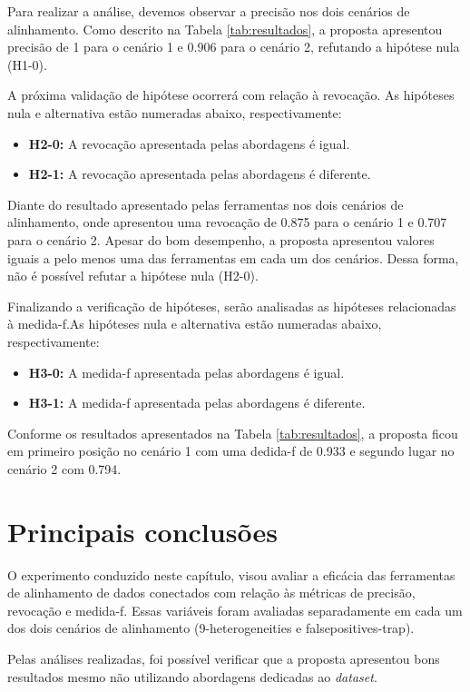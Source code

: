 Para realizar a análise, devemos observar a precisão nos dois cenários de alinhamento. Como descrito na Tabela \ref{tab:resultados}, a proposta apresentou precisão de 1 para o cenário 1 e 0.906 para o cenário 2, refutando a hipótese nula (H1-0).

A próxima validação de hipótese ocorrerá com relação à revocação. As hipóteses nula e alternativa estão numeradas abaixo, respectivamente:

\begin{itemize}
\item \textbf{H2-0:} A revocação apresentada pelas abordagens é igual.
\item \textbf{H2-1:} A revocação apresentada pelas abordagens é diferente.
\end{itemize}

Diante do resultado apresentado pelas ferramentas nos dois cenários de alinhamento, onde apresentou uma revocação de 0.875 para o cenário 1 e 0.707 para o cenário 2. Apesar do bom desempenho, a proposta apresentou valores iguais a pelo menos uma das ferramentas em cada um dos cenários. Dessa forma, não é possível refutar a hipótese nula (H2-0).

Finalizando a verificação de hipóteses, serão analisadas as hipóteses relacionadas à medida-f.As hipóteses nula e alternativa estão numeradas abaixo, respectivamente:

\begin{itemize}
\item \textbf{H3-0:} A medida-f apresentada pelas abordagens é igual.
\item \textbf{H3-1:} A medida-f apresentada pelas abordagens é diferente.
\end{itemize}

Conforme os resultados apresentados na Tabela \ref{tab:resultados}, a proposta ficou em primeiro posição no cenário 1 com uma dedida-f de 0.933 e segundo lugar no cenário 2 com 0.794.

\section{Principais conclusões}
O experimento conduzido neste capítulo, visou avaliar a eficácia das ferramentas de alinhamento de dados conectados com relação às métricas de precisão, revocação e medida-f. Essas variáveis foram avaliadas separadamente em cada um dos dois cenários de alinhamento (9-heterogeneities e falsepositives-trap).

Pelas análises realizadas, foi possível verificar que a proposta apresentou bons resultados mesmo não utilizando abordagens dedicadas ao \textit{dataset}.